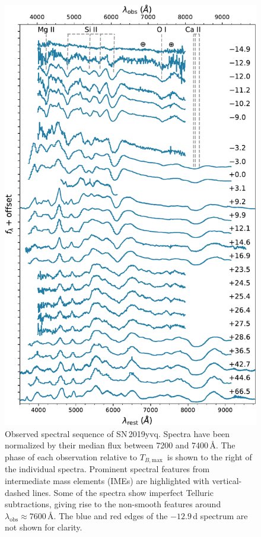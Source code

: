 \documentclass[twocolumn]{aastex63}
\newcommand{\tbmax}{$T_{B,\mathrm{max}}$}
\newcommand{\sn}{SN\,2019yvq}
\begin{document}
\begin{figure}
    \centering
    \includegraphics[width=\columnwidth]{./figures/spec_evo.pdf}
    \caption{Observed spectral sequence of \sn. Spectra have been normalized
    by their median flux between 7200 and 7400\,\AA. The phase of each
    observation relative to \tbmax\ is shown to the right of the individual
    spectra. Prominent spectral features from intermediate mass elements
    (IMEs) are highlighted with vertical-dashed lines. Some of the spectra
    show imperfect Telluric subtractions, giving rise to the non-smooth
    features around $\lambda_\mathrm{obs} \approx 7600$\,\AA. The blue and red
    edges of the $-12.9$\,d spectrum are not shown for clarity.}
    \label{fig:spec_evo}
\end{figure}
\end{document}
